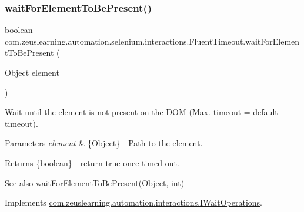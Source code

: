 \subsubsection{\texorpdfstring{wait\+For\+Element\+To\+Be\+Present()}{waitForElementToBePresent()}\hspace{0.1cm}{\footnotesize\ttfamily [1/2]}}
{\footnotesize\ttfamily boolean com.\+zeuslearning.\+automation.\+selenium.\+interactions.\+Fluent\+Timeout.\+wait\+For\+Element\+To\+Be\+Present (\begin{DoxyParamCaption}\item[{Object}]{element }\end{DoxyParamCaption})\hspace{0.3cm}{\ttfamily [inline]}}

Wait until the element is not present on the D\+OM (Max. timeout = default timeout).


\begin{DoxyParams}{Parameters}
{\em element} & \{Object\} -\/ Path to the element.\\
\hline
\end{DoxyParams}
\begin{DoxyReturn}{Returns}
\{boolean\} -\/ return {\ttfamily true} once timed out.
\end{DoxyReturn}
\begin{DoxySeeAlso}{See also}
\hyperlink{classcom_1_1zeuslearning_1_1automation_1_1selenium_1_1interactions_1_1FluentTimeout_afce3a66e8c4bab59f37be96fd45eeec3}{wait\+For\+Element\+To\+Be\+Present(\+Object, int)} 
\end{DoxySeeAlso}


Implements \hyperlink{interfacecom_1_1zeuslearning_1_1automation_1_1interactions_1_1IWaitOperations_a37e642af4e56132b564fa67e34e973d4}{com.\+zeuslearning.\+automation.\+interactions.\+I\+Wait\+Operations}.

\hypertarget{classcom_1_1zeuslearning_1_1automation_1_1selenium_1_1interactions_1_1FluentTimeout_afce3a66e8c4bab59f37be96fd45eeec3}{}\label{classcom_1_1zeuslearning_1_1automation_1_1selenium_1_1interactions_1_1FluentTimeout_afce3a66e8c4bab59f37be96fd45eeec3} 
